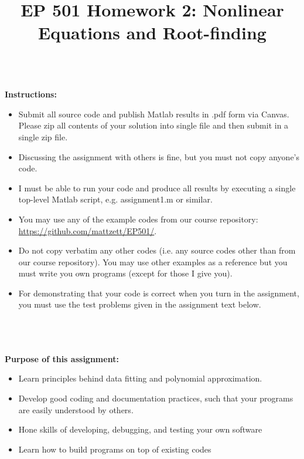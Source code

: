 \documentclass{article}
\begin{document}
\title{EP 501 Homework 2:  Nonlinear Equations and Root-finding}

\maketitle

~\\
\textbf{Instructions:}  
\begin{itemize}
  \item Submit all source code and publish Matlab results in .pdf form via Canvas.  Please zip all contents of your solution into single file and then submit in a single zip file.    
  \item Discussing the assignment with others is fine, but you must not copy anyone's code.  
  \item I must be able to run your code and produce all results by executing a single top-level Matlab script, e.g. \textsf{assignment1.m} or similar.  
  \item You may use any of the example codes from our course repository:  \url{https://github.com/mattzett/EP501/}.
  \item Do not copy verbatim any other codes (i.e. any source codes other than from our course repository).  You may use other examples as a reference but you must write you own programs (except for those I give you).  
    \item For demonstrating that your code is correct when you turn in the assignment, you must use the test problems given in the assignment text below.  

\end{itemize}
~\\~\\~\\
\textbf{Purpose of this assignment:}  
\begin{itemize}
  \item Learn principles behind data fitting and polynomial approximation.  
  \item Develop good coding and documentation practices, such that your programs are easily understood by others.  
  \item Hone skills of developing, debugging, and testing your own software
  \item Learn how to build programs on top of existing codes
\end{itemize}

\pagebreak
\end{document}

